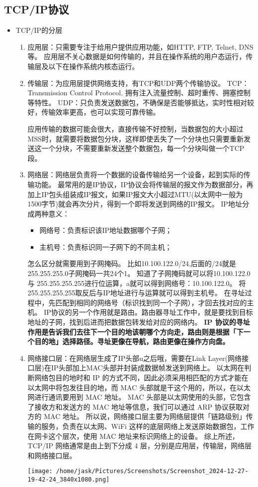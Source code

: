 \documentclass[11pt]{article}
\begin{document}
\subsection{TCP/IP协议}
\label{sec:org91bf576}
\begin{itemize}
\item TCP/IP的分层
\begin{enumerate}
\item 应用层：只需要专注于给用户提供应用功能，如HTTP, FTP, Telnet, DNS等。
应用层不关心数据是如何传输的，并且在操作系统的用户态运行，传输层及以下在操作系统内核态运行。
\item 传输层：为应用层提供网络支持，有TCP和UDP两个传输协议。
TCP：Transmission Control Protocol, 拥有注入流量控制、超时重传、拥塞控制等特性。
UDP：只负责发送数据包，不确保是否能够抵达，实时性相对较好，传输效率更高，也可以实现可靠传输。

应用传输的数据可能会很大，直接传输不好控制，当数据包的大小超过MSS时，就需要将数据包分块，这样即使丢失了一个分块也只需要重新发送这一个分块，不需要重新发送整个数据包，每一个分块叫做一个TCP段。
\item 网络层：网络层负责将一个数据的设备传输给另一个设备，起到实际的传输功能。
最常用的是IP协议，IP协议会将传输层的报文作为数据部分，再加上IP包头组装成IP报文，如果IP报文大小超过MTU(以太网中一般为1500字节)就会再次分片，得到一个即将发送到网络的IP报文。
IP地址分成两种意义：
\begin{itemize}
\item 网络号：负责标识该IP地址数据哪个子网；
\item 主机号：负责标识同一子网下的不同主机；
\end{itemize}
怎么区分就需要用到子网掩码。
比如10.100.122.0/24,后面的/24就是255.255.255.0子网掩码一共24个1。
知道了子网掩码就可以将10.100.122.0 与 255.255.255.255进行位运算，a就可以得到网络号：10.100.122.0。
将255.255.255.255取反后与IP地址进行与运算就可以得到主机号。
在寻址过程中，先匹配到相同的网络号（标识找到同一个子网），才回去找对应的主机。
IP协议的另一个作用就是路由。路由器寻址工作中，就是要找到目标地址的子网，找到后进而把数据包转发给对应的网络内。
\textbf{IP 协议的寻址作用是告诉我们去往下一个目的地该朝哪个方向走，路由则是根据「下一个目的地」选择路径。寻址更像在导航，路由更像在操作方向盘。}
\item 网络接口层：在网络层生成了IP头部u之后哦，需要在Link Layer(网络接口层)在IP头部加上MAC头部并封装成数据帧发送到网络上。
以太网在判断网络包目的地时和 IP 的方式不同，因此必须采用相匹配的方式才能在以太网中将包发往目的地，而 MAC 头部就是干这个用的，所以，在以太网进行通讯要用到 MAC 地址。
MAC 头部是以太网使用的头部，它包含了接收方和发送方的 MAC 地址等信息，我们可以通过 ARP 协议获取对方的 MAC 地址。
所以说，网络接口层主要为网络层提供「链路级别」传输的服务，负责在以太网、WiFi 这样的底层网络上发送原始数据包，工作在网卡这个层次，使用 MAC 地址来标识网络上的设备。
综上所述，TCP/IP 网络通常是由上到下分成 4 层，分别是应用层，传输层，网络层和网络接口层。
\begin{center}
\texttt{[image: /home/jask/Pictures/Screenshots/Screenshot\_2024-12-27-19-42-24\_3840x1080.png]}
\end{center}
\end{enumerate}
\end{itemize}
\end{document}
